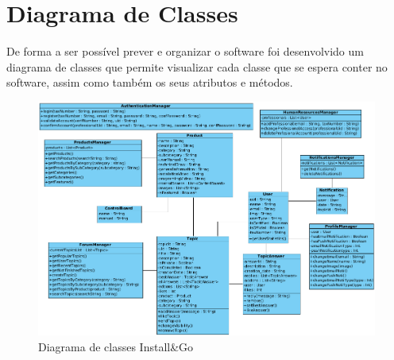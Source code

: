\section{Diagrama de Classes}

De forma a ser possível prever e organizar o software foi desenvolvido um diagrama de classes que permite visualizar cada classe que se espera conter no software, assim como também os seus atributos e métodos.

\begin{figure}[htb]
    \centering
    
    \includegraphics[width=\textwidth]{images/diagramas/diagrama_classes.png}
    \caption{Diagrama de classes Install\&Go}
    \label{fig:22}
\end{figure}
